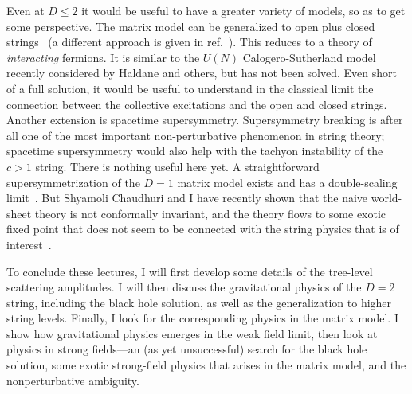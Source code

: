 Even at $D \leq 2$
it would be useful to have a greater variety of models, so
as to get some perspective.
The matrix model can be generalized to open plus closed
strings~\cite{Yopen} (a different approach is given in
ref.~\cite{KKomm}).  This reduces to a theory of {\it interacting}
fermions.  It is similar to the
$U(N)$ Calogero-Sutherland model recently considered by Haldane and
others, but has not been solved.  Even short of a full solution, it
would be useful to understand in the classical limit the connection
between the collective excitations and the open and closed strings. 
Another extension is spacetime supersymmetry.  Supersymmetry breaking
is after all one of the most important non-perturbative phenomenon
in string theory; spacetime supersymmetry would also help with the
tachyon instability of the $c>1$ string.  There is nothing useful
here yet.  A straightforward supersymmetrization of the $D=1$
matrix model exists and has a
double-scaling limit~\cite{MPar}. But Shyamoli Chaudhuri and I have
recently shown that the naive world-sheet theory is not conformally
invariant, and the theory flows to some exotic fixed point that
does not seem to be connected with the string physics that is of
interest~\cite{CPmp}.

To conclude these lectures, I will first develop some details
of the tree-level scattering amplitudes.  I will then discuss the
gravitational physics of the $D=2$ string, including the black hole
solution, as well as the
generalization to higher string levels.  Finally, I look for the
corresponding physics in the matrix model.  I show how
gravitational physics emerges in the weak field limit, then look at
physics in strong fields---an (as yet unsuccessful) search for the
black hole solution, some exotic strong-field physics that arises
in the matrix model, and the nonperturbative ambiguity.


